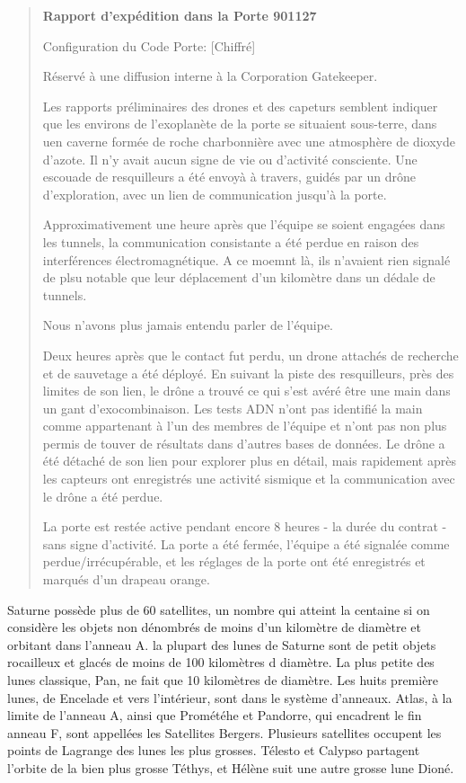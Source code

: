 \begin{quotation} \textbf{Rapport d'expédition dans la Porte 901127} 

Configuration du Code Porte: [Chiffré] 

Réservé à une diffusion interne à la Corporation Gatekeeper. 

Les rapports préliminaires des drones et des capeturs semblent indiquer que les environs de l'exoplanète de la porte se situaient sous-terre, dans uen caverne formée de roche charbonnière avec une atmosphère de dioxyde d'azote. Il n'y avait aucun signe de vie ou d'activité consciente. Une escouade de resquilleurs a été envoyà à travers, guidés par un drône d'exploration, avec un lien de communication jusqu'à la porte. 

Approximativement une heure après que l'équipe se soient engagées dans les tunnels, la communication consistante a été perdue en raison des interférences électromagnétique. A ce moemnt là, ils n'avaient rien signalé de plsu notable que leur déplacement d'un kilomètre dans un dédale de tunnels. 

Nous n'avons plus jamais entendu parler de l'équipe. 

Deux heures après que le contact fut perdu, un drone attachés de recherche et de sauvetage a été déployé. En suivant la piste des resquilleurs, près des limites de son lien, le drône a trouvé ce qui s'est avéré être une main dans un gant d'exocombinaison. Les tests ADN n'ont pas identifié la main comme appartenant à l'un des membres de l'équipe et n'ont pas non plus permis de touver de résultats dans d'autres bases de données. Le drône a été détaché de son lien pour explorer plus en détail, mais rapidement après les capteurs ont enregistrés une activité sismique et la communication avec le drône a été perdue. 

La porte est restée active pendant encore 8 heures - la durée du contrat - sans signe d'activité. La porte a été fermée, l'équipe a été signalée comme perdue/irrécupérable, et les réglages de la porte ont été enregistrés et marqués d'un drapeau orange. \end{quotation} 





Saturne possède plus de 60 satellites, un nombre qui atteint la centaine si on considère les objets non dénombrés de moins d'un kilomètre de diamètre et orbitant dans l'anneau A. la plupart des lunes de Saturne sont de petit objets rocailleux et glacés de moins de 100 kilomètres d diamètre. La plus petite des lunes classique, Pan, ne fait que 10 kilomètres de diamètre. Les huits première lunes, de Encelade et vers l'intérieur, sont dans le système d'anneaux. Atlas, à la limite de l'anneau A, ainsi que Prométéhe et Pandorre, qui encadrent le fin anneau F, sont appellées les Satellites Bergers. Plusieurs satellites occupent les points de Lagrange des lunes les plus grosses. Télesto et Calypso partagent l'orbite de la bien plus grosse Téthys, et Hélène suit une autre grosse lune Dioné. 

